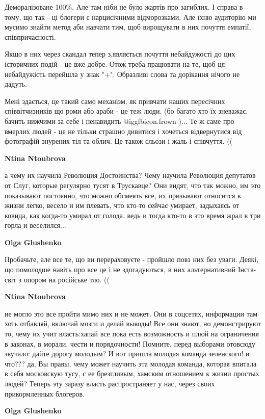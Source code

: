 \begin{itemize}
\begin{itemize}
Деморалізоване 100\%. Але там ніби не було жартів про загиблих. І справа в тому,
що так - ці блогери є нарцисічними відморозками. Але їхню аудиторію ми мусимо
знайти метод аби навчати тим, щоб вирощувати в них почуття емпатії,
співпричасності.

Якщо в них через скандал тепер з,являється почуття небайдужості до цих
історичних подій - це вже добре. Отож треба працювати на те, щоб ця
небайдужість перейшла у знак "+". Образливі слова та дорікання нічого не
дадуть.

Мені здається, це такий само механізм, як привчати наших пересічних
співвітчизників що роми або араби - це теж люди. (бо багато хто їх зневажає,
бачить нижчими за себе і ненавидить  @igg{fbicon.frown} )... Те ж саме про вмерлих людей - це не
тільки страшно дивитися і хочеться відвернутися від фотографій знурених тіл та
облич. Це також сльози і жаль і співчуття. ((

\textbf{Ntina Ntoubrova} 

а чему их научила Революция Достоинства? Чему научила Революция депутатов от
Слуг, которые регулярно тусят в Трускавце? Они видят, что так можно, им это
показывают постоянно, что можно обсмеять все, их призывают относится к жизни
легко, весело и им плевать, что кто-то сейчас умирает, задыхаясь от ковида, как
когда-то умирал от голода. ведь и тогда кто-то в это время жрал в три горла и
веселился...


\textbf{Olga Glushenko} 

Пробачьте, але все те, що ви перераховуєте - пройшло повз них без уваги. Деякі,
що помолодше навіть про все це і не здогадуються, в них альтернативний
Інста-світ з опором на російське тло. ((

\textbf{Ntina Ntoubrova} 

не могло это все пройти мимо них и не может. Они в соцсетях, информации там хоть
отбавляй, включай мозги и делай выводы! Все они знают, но демонстрируют то, чему
их учит власть:хапай все пока есть возможность и плюй на ограничения в
законах, в морали, чести и порядочности! Помните, перед выборами отовсюду
звучало: дайте дорогу молодым? И вот пришла молодая команда зеленского! и
что??? да, Вы правы, чему может научить эта молодая команда, которая впитала в
себя московскую тусу, с ее брезгливым, хамским отношением к жизни простых людей?
Теперь эту заразу власть распространяет у нас, через своих прикормленных
блогеров.


\textbf{Olga Glushenko} 


\end{itemize}
\end{itemize}
